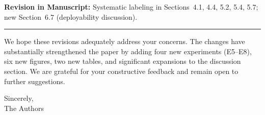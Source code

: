 \documentclass[11pt,a4paper]{article}
\newcommand{\revision}[1]{%
  \noindent\textbf{Revision in Manuscript:} #1\vspace{4pt}}
\begin{document}
\revision{Systematic labeling in Sections~4.1, 4.4, 5.2, 5.4, 5.7; new Section~6.7 (deployability discussion).}

\vspace{12pt}
\noindent\rule{\textwidth}{0.4pt}
\vspace{6pt}

\noindent We hope these revisions adequately address your concerns. The changes have substantially strengthened the paper by adding four new experiments (E5--E8), six new figures, two new tables, and significant expansions to the discussion section. We are grateful for your constructive feedback and remain open to further suggestions.

\vspace{12pt}
\noindent Sincerely,\\
The Authors
\end{document}
